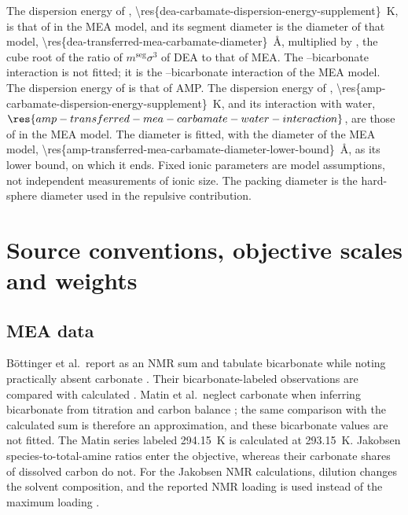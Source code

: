 \documentclass[a4paper,11pt]{article}
\begin{document}
The dispersion energy of , \SI{\res{dea-carbamate-dispersion-energy-supplement}}{\kelvin}, is that of  in the MEA model, and its segment diameter is the  diameter of that model, \SI{\res{dea-transferred-mea-carbamate-diameter}}{\angstrom}, multiplied by , the cube root of the ratio of $m^{\mathrm{seg}}\sigma^3$ of DEA to that of MEA.
The --bicarbonate interaction is not fitted; it is the --bicarbonate interaction of the MEA model.
The dispersion energy of  is that of AMP.
The dispersion energy of , \SI{\res{amp-carbamate-dispersion-energy-supplement}}{\kelvin}, and its interaction with water, $\res{amp-transferred-mea-carbamate-water-interaction}$, are those of  in the MEA model.
The  diameter is fitted, with the  diameter of the MEA model, \SI{\res{amp-transferred-mea-carbamate-diameter-lower-bound}}{\angstrom}, as its lower bound, on which it ends.
Fixed ionic parameters are model assumptions, not independent measurements of ionic size.
The packing diameter is the hard-sphere diameter used in the repulsive contribution.



\section{Source conventions, objective scales and weights}\label{sec:s-corrections}\label{sec:s-objective}
\subsection{MEA data}
B\"ottinger et al.\ report  as an NMR sum and tabulate bicarbonate while noting practically absent carbonate \cite{Bottinger2008}.
Their bicarbonate-labeled observations are compared with calculated .
Matin et al.\ neglect carbonate when inferring bicarbonate from titration and carbon balance \cite{matinFacileMethodDetermination2012}; the same comparison with the calculated sum is therefore an approximation, and these bicarbonate values are not fitted.
The Matin series labeled \SI{294.15}{\kelvin} is calculated at \SI{293.15}{\kelvin}.
Jakobsen species-to-total-amine ratios enter the objective, whereas their carbonate shares of dissolved carbon do not.
For the Jakobsen NMR calculations, dilution changes the solvent composition, and the reported NMR loading is used instead of the maximum loading \cite{Jakobsen2005}.
\end{document}
